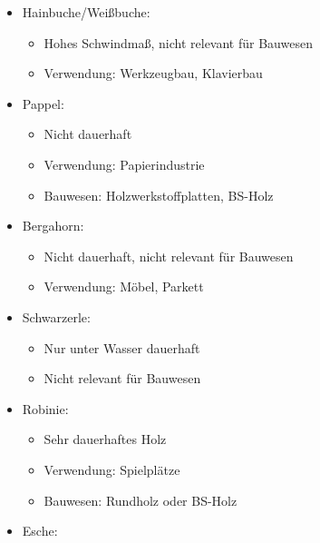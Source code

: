 \documentclass[fleqn,twoside]{article}
\begin{document}
\begin{itemize}
                \begin{itemize}
                    \item Hainbuche/Weißbuche:
                        \begin{itemize}
                            \item Hohes Schwindmaß, nicht relevant für Bauwesen
                            \item Verwendung: Werkzeugbau, Klavierbau
                        \end{itemize}
                    \item Pappel:
                        \begin{itemize}
                            \item Nicht dauerhaft
                            \item Verwendung: Papierindustrie
                            \item Bauwesen: Holzwerkstoffplatten, BS-Holz
                        \end{itemize}
                    \item Bergahorn:
                        \begin{itemize}
                            \item Nicht dauerhaft, nicht relevant für Bauwesen
                            \item Verwendung: Möbel, Parkett
                        \end{itemize}
                    \item Schwarzerle:
                        \begin{itemize}
                            \item Nur unter Wasser dauerhaft
                            \item Nicht relevant für Bauwesen
                        \end{itemize}
                    \item Robinie:
                        \begin{itemize}
                            \item Sehr dauerhaftes Holz
                            \item Verwendung: Spielplätze
                            \item Bauwesen: Rundholz oder BS-Holz
                        \end{itemize}
                    \item Esche:
                        \begin{itemize}

\end{itemize}
\end{itemize}
\end{itemize}
\end{document}
